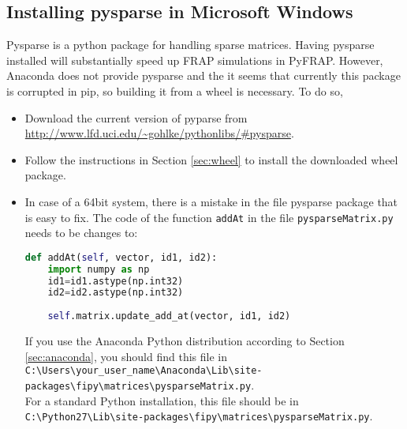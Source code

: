 \documentclass[a4paper,11pt]{article}
\begin{document}
\subsection{Installing pysparse in Microsoft Windows}
\label{sec:pysparsewin}
Pysparse is a python package for handling sparse matrices. Having pysparse installed will substantially speed up FRAP simulations in PyFRAP. However, Anaconda does not provide pysparse and the it seems that currently  this package is corrupted in pip, so building it from a wheel is necessary.
To do so,
\begin{itemize}
\item Download  the current version of pyparse from \url{http://www.lfd.uci.edu/~gohlke/pythonlibs/#pysparse}.
\item Follow the instructions in Section \ref{sec:wheel} to install the downloaded wheel package.
\item In case of a 64bit system, there is a mistake in the file pysparse package that is easy to fix. The code of the function \verb+addAt+ in the file \verb+pysparseMatrix.py+ needs to be changes to:
\begin{lstlisting}[frame=single,language=python]  
 def addAt(self, vector, id1, id2):
    import numpy as np
    id1=id1.astype(np.int32)
    id2=id2.astype(np.int32)
    
    self.matrix.update_add_at(vector, id1, id2) 
  \end{lstlisting}
  If you use the Anaconda Python distribution according to Section \ref{sec:anaconda}, you should find this file in \\ 
  \verb+C:\Users\your_user_name\Anaconda\Lib\site-packages\fipy\matrices\pysparseMatrix.py+.\\
  For a standard Python installation, this file should be in \\ \verb+C:\Python27\Lib\site-packages\fipy\matrices\pysparseMatrix.py+.
  
\end{itemize}
\end{document}
